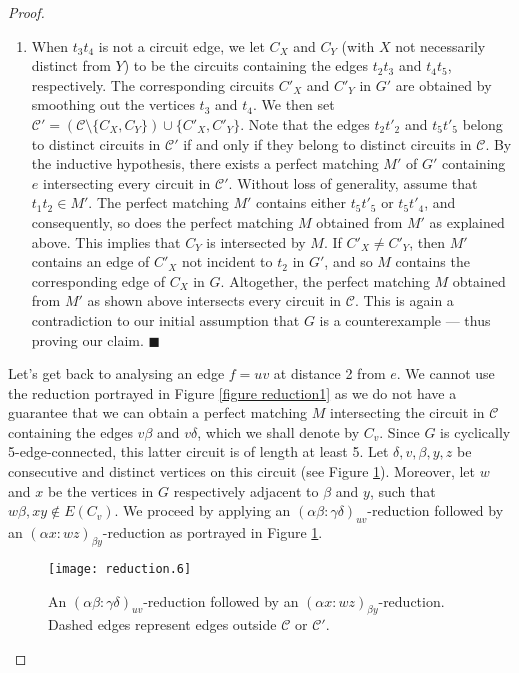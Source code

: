 \documentclass[]{theclass}
\begin{document}
\begin{proof}
\begin{enumerate}[label=(\roman*)]
\item When $t_3t_4$ is not a circuit edge, we let $C_X$ and $C_Y$ (with $X$ not necessarily distinct from $Y$) to be the circuits containing the edges $t_2t_3$ and $t_4t_5$, respectively. The corresponding circuits $C'_X$ and $C'_Y$ in $G'$ are obtained by smoothing out the vertices $t_3$ and $t_4$. We then set $\mathcal{C}'=(\mathcal{C}\setminus \{C_X,C_Y\})\cup \{C'_X,C'_Y\}$. Note that the edges $t_2t'_2$ and $t_5t'_5$ belong to distinct circuits in $\mathcal{C}'$ if and only if they belong to distinct circuits in $\mathcal{C}$. By the inductive hypothesis, there exists a perfect matching $M'$ of $G'$ containing $e$ intersecting every circuit in $\mathcal{C}'$. Without loss of generality, assume that $t_1t_2\in M'$. The perfect matching $M'$ contains either $t_5t'_5$ or $t_5t'_4$, and consequently, so does the perfect matching $M$ obtained from $M'$ as explained above. This implies that $C_Y$ is intersected by $M$. If $C'_X\neq C'_Y$, then  $M'$ contains an edge of $C'_X$ not incident to $t_2$ in $G'$, and so $M$ contains the corresponding edge of $C_X$ in $G$. Altogether, the perfect matching $M$ obtained from $M'$ as shown above intersects every circuit in $\mathcal{C}$. This is again a contradiction to our initial assumption that $G$ is a counterexample --- thus proving our claim. \hfill {\tiny$\blacksquare$}
\end{enumerate}

Let's get back to analysing an edge $f=uv$ at distance 2 from $e$.
 We cannot use the reduction portrayed in Figure \ref{figure reduction1} as we do not have a guarantee that we can obtain a perfect matching $M$ intersecting the circuit in $\mathcal{C}$ containing the edges $v\beta$ and $v\delta$, which we shall denote by $C_v$. Since $G$ is cyclically 5-edge-connected, this latter circuit is of length at least 5. Let $\delta, v, \beta, y,z $ be consecutive and distinct vertices on this circuit (see Figure \ref{figure reduction2}). Moreover, let $w$ and $x$ be the vertices in $G$ respectively adjacent to $\beta$ and $y$, such that $w\beta, xy \notin E(C_v)$. We proceed by applying an $(\alpha\beta:\gamma\delta)_{uv}$-reduction followed by an $(\alpha x:wz)_{\beta y}$-reduction as portrayed in Figure \ref{figure reduction2}.

\begin{figure}[ht]
      \centering
      \texttt{[image: reduction.6]}
      \caption{An $(\alpha\beta:\gamma\delta)_{uv}$-reduction followed by an $(\alpha x:wz)_{\beta y}$-reduction. Dashed edges represent edges outside $\mathcal{C}$ or $\mathcal{C'}$.}
      \label{figure reduction2}
\end{figure}


\end{proof}
\end{document}

